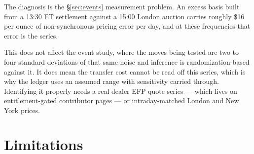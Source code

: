 \documentclass[11pt,a4paper]{article}
\begin{document}
The diagnosis is the \S\ref{sec:events} measurement problem. An excess basis built from a
13:30 ET settlement against a 15:00 London auction carries roughly \$16 per ounce of
non-synchronous pricing error per day, and at these frequencies that error is the series.

This does not affect the event study, where the moves being tested are two to four standard
deviations of that same noise and inference is randomization-based against it. It does mean the
transfer cost cannot be read off this series, which is why the ledger uses an assumed range with
sensitivity carried through. Identifying it properly needs a real dealer EFP quote series --- which
lives on entitlement-gated contributor pages --- or intraday-matched London and New York prices.

\section{Limitations}
\end{document}
